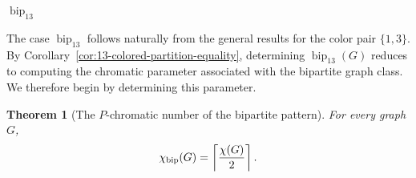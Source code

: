 \documentclass[12pt]{article}
\theoremstyle{plain}
\newtheorem{theorem}{Theorem}[section]
\theoremstyle{definition}
\theoremstyle{remark}
\theoremstyle{definition}
\newcommand{\biplabel}{\mathrm{bip}}
\DeclareRobustCommand{\bipname}{%
  \ensuremath{\mathop{\biplabel}\nolimits}%
}
\DeclareRobustCommand{\bipparam}[1]{%
  \ensuremath{\mathop{\biplabel}\nolimits_{#1}}%
}
\begin{document}
\begin{center}

\smallskip
\(\bipparam{13}\)
\end{center}



The case \(\bipparam{13}\) follows naturally from the general results for
the color pair \(\{1,3\}\). By
Corollary~\ref{cor:13-colored-partition-equality}, determining
\(\bipparam{13}(G)\) reduces to computing the chromatic parameter associated
with the bipartite graph class. We therefore begin by determining this
parameter.


\begin{theorem}[The \(P\)-chromatic number of the bipartite pattern]
\label{thm:bip-P-chromatic-number}
For every graph \(G\),
\[
\chi_{\bipname}(G)
=
\left\lceil\frac{\chi(G)}{2}\right\rceil.
\]
\end{theorem}
\end{document}

